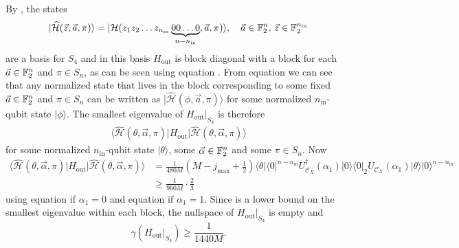 \documentclass[../thesis-main/thesis-main]{subfiles}
\begin{document}
By , the states 
\begin{align}
|\widehat{\mathcal{H}}(\vec{z},\vec{a},\pi)\rangle = |\mathcal{H}(z_1 z_2\ldots z_{n_{\text{in}}}\underbrace{00\ldots0}_{n-n_{\text{in}}},\vec{a},\pi)\rangle,
\quad\vec{a}\in\mathbb{F}_2^{n},\,\vec{z}\in\mathbb{F}_2^{n_{{\text{in}}}}
\end{align}
are a basis for $S_{4}$ and in this basis $H_{{\text{out}}}$ is block diagonal with a block for each $\vec{a}\in\mathbb{F}_2^{n}$ and $\pi\in S_n$, as can be seen using equation . 
From equation  we can see that any normalized state that lives in the block corresponding to some fixed $\vec{a}\in\mathbb{F}_2^{n}$ and $\pi\in S_n$ can be written as $|\widehat{\mathcal{H}}(\phi,\vec{a},\pi)\rangle$ for some normalized $n_{{\text{in}}}$-qubit state $|\phi\rangle$. The smallest eigenvalue of $H_{{\text{out}}}|_{S_{4}}$ is therefore
\begin{align}
\langle\widehat{\mathcal{H}}(\theta,\vec{\alpha},\pi)|H_{{\text{out}}}|\widehat{\mathcal{H}}(\theta,\vec{\alpha},\pi)\rangle
\end{align}
for some normalized $n_{{\text{in}}}$-qubit state $|\theta\rangle$, some $\vec{\alpha}\in\mathbb{F}_2^{n}$ and some $\pi\in S_n$. Now 
\begin{align}
\langle\widehat{\mathcal{H}}(\theta,\vec{\alpha},\pi)|H_{{\text{out}}}|\widehat{\mathcal{H}}(\theta,\vec{\alpha},\pi)\rangle & = \frac{1}{480M}(M-j_{\max}+\tfrac{1}{2})\langle\theta|\langle0|^{n-n_{{\text{in}}}}U_{\mathcal{C}_{X}}^{\dagger}(\alpha_{1})|0\rangle\langle0|_{2}U_{\mathcal{C}_{X}}(\alpha_{1})|\theta\rangle|0\rangle^{n-n_{{\text{in}}}}\\
 & \geq \frac{1}{960M}\cdot\frac{2}{3}\label{eq:h_phi_a_expectation}
\end{align}
using equation  if $\alpha_{1}=0$ and equation  if $\alpha_{1}=1$. Since  is a lower bound on the smallest eigenvalue within each block, the nullspace of $H_{{\text{out}}}|_{S_{4}}$ is empty and 
\begin{equation}
\gamma(H_{{\text{out}}}|_{S_{4}})\geq\frac{1}{1440M}.\label{eq:bound_lowesteigvalue}
\end{equation}
\end{document}
